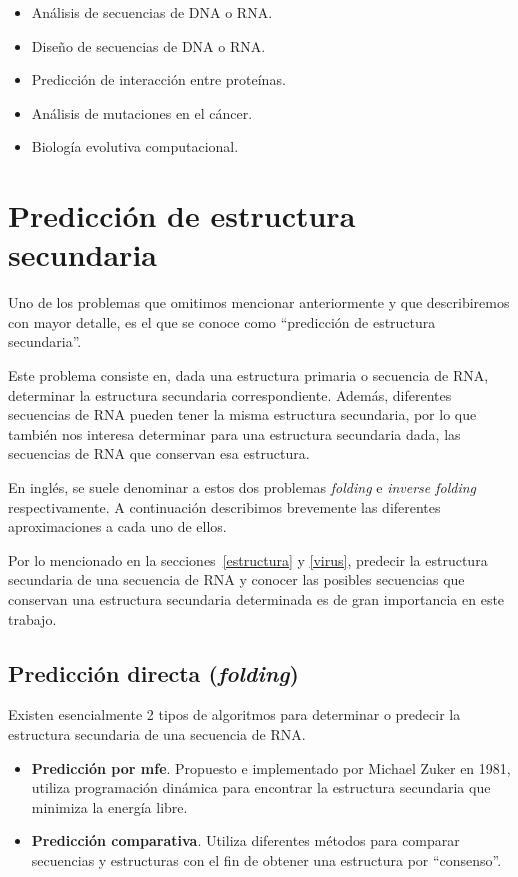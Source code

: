 \begin{itemize}
 \item An\'alisis de secuencias de \ac{DNA} o \ac{RNA}.
 \item Dise\~no de secuencias de \ac{DNA} o \ac{RNA}.
 \item Predicci\'on de interacci\'on entre prote\'inas.
 \item An\'alisis de mutaciones en el c\'ancer.
 \item Biolog\'ia evolutiva computacional.
\end{itemize}

\section{Predicci\'on de estructura secundaria}

Uno de los problemas que omitimos mencionar anteriormente y que describiremos
con mayor detalle, es el que se conoce como ``predicci\'on de estructura
secundaria''. 

Este problema consiste en, dada una estructura primaria o secuencia de \ac{RNA},
determinar la estructura secundaria correspondiente. Adem\'as, diferentes
secuencias de \ac{RNA} pueden tener la misma estructura secundaria, por lo que
tambi\'en nos interesa determinar para una estructura secundaria dada, las
secuencias de \ac{RNA} que conservan esa estructura. 

En ingl\'es, se suele denominar a estos dos problemas \textit{folding} e
\textit{inverse folding} respectivamente. A continuaci\'on describimos
brevemente las diferentes aproximaciones a cada uno de ellos.

Por lo mencionado en la secciones~\ref{estructura} y \ref{virus}, predecir la
estructura secundaria de una secuencia de \ac{RNA} y conocer las posibles
secuencias que conservan una estructura secundaria determinada es de gran
importancia en este trabajo.

\subsection{Predicci\'on directa (\textit{folding})}
\label{folding}
Existen esencialmente 2 tipos de algoritmos para determinar o predecir la
estructura secundaria de una secuencia de \ac{RNA}.

\begin{itemize} 
 \item \textbf{Predicci\'on por \ac{mfe}}. Propuesto e implementado por Michael
Zuker en 1981\cite{Zuker81}, utiliza programaci\'on din\'amica para encontrar la
estructura secundaria que minimiza la energ\'ia libre.
 \item \textbf{Predicci\'on comparativa}. Utiliza diferentes m\'etodos para
comparar secuencias y estructuras con el fin de obtener una estructura por
``consenso''\cite{Gardner04}.
\end{itemize}

